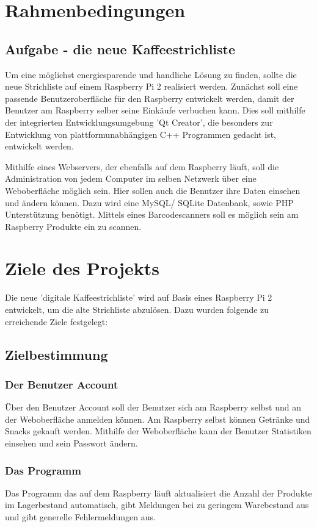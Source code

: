 \documentclass[11pt,a4paper]{article} %
\begin{document}
\section{Rahmenbedingungen}


\subsection{Aufgabe - die neue Kaffeestrichliste}
\label{SchriftAnpassen}

Um eine möglichst energiesparende und handliche Lösung zu finden, sollte die neue Strichliste auf einem Raspberry Pi 2 realisiert werden. Zunächst soll eine passende Benutzeroberfläche für den Raspberry entwickelt werden, damit der Benutzer am Raspberry selber seine Einkäufe verbuchen kann. Dies soll mithilfe der integrierten Entwicklungsumgebung 'Qt Creator', die besonders zur Entwicklung von plattformunabhängigen C++ Programmen gedacht ist, entwickelt werden.
\par
Mithilfe eines Webservers, der ebenfalls auf dem Raspberry läuft, soll die Administration von jedem Computer im selben Netzwerk über eine Weboberfläche möglich sein. Hier sollen auch die Benutzer ihre Daten einsehen und ändern können. Dazu wird eine MySQL/ SQLite Datenbank, sowie PHP Unterstützung benötigt. Mittels eines Barcodescanners soll es möglich sein am Raspberry Produkte ein zu scannen.


\section{Ziele des Projekts}
Die neue 'digitale Kaffeestrichliste' wird auf Basis eines Raspberry Pi 2 entwickelt, um die alte Strichliste abzulösen. Dazu wurden folgende zu erreichende Ziele festgelegt:
\subsection{Zielbestimmung}
\label{Ausrichtung}

\subsubsection{Der Benutzer Account}
\"Uber den Benutzer Account soll der Benutzer sich am Raspberry selbst und an der Weboberfläche anmelden können. Am Raspberry selbst können Getränke und Snacks gekauft werden. Mithilfe der Weboberfläche kann der Benutzer Statistiken einsehen und sein Passwort ändern.

\subsubsection{Das Programm}
Das Programm das auf dem Raspberry läuft aktualisiert die Anzahl der Produkte im Lagerbestand automatisch, gibt Meldungen bei zu geringem Warebestand aus und gibt generelle Fehlermeldungen aus.
\end{document}
